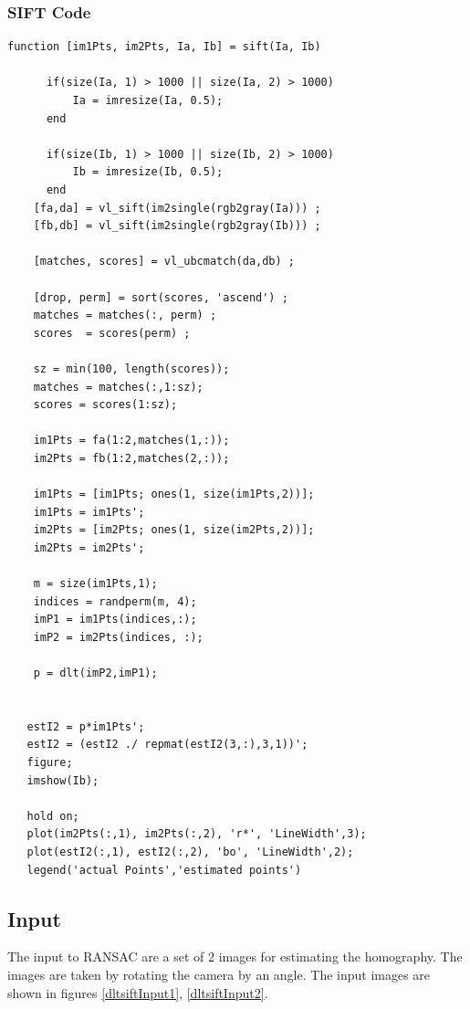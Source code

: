 \documentclass[12pt]{article}
\begin{document}
\subsubsection{SIFT Code}
\begin{lstlisting}
function [im1Pts, im2Pts, Ia, Ib] = sift(Ia, Ib)
    
      if(size(Ia, 1) > 1000 || size(Ia, 2) > 1000)
          Ia = imresize(Ia, 0.5);
      end
     
      if(size(Ib, 1) > 1000 || size(Ib, 2) > 1000)
          Ib = imresize(Ib, 0.5);
      end
    [fa,da] = vl_sift(im2single(rgb2gray(Ia))) ;
    [fb,db] = vl_sift(im2single(rgb2gray(Ib))) ;

    [matches, scores] = vl_ubcmatch(da,db) ;

    [drop, perm] = sort(scores, 'ascend') ;
    matches = matches(:, perm) ;
    scores  = scores(perm) ;

    sz = min(100, length(scores));
    matches = matches(:,1:sz);
    scores = scores(1:sz);

    im1Pts = fa(1:2,matches(1,:));
    im2Pts = fb(1:2,matches(2,:));
    
    im1Pts = [im1Pts; ones(1, size(im1Pts,2))];
    im1Pts = im1Pts';
    im2Pts = [im2Pts; ones(1, size(im2Pts,2))];
    im2Pts = im2Pts';
     
    m = size(im1Pts,1);
    indices = randperm(m, 4);
   	imP1 = im1Pts(indices,:);
   	imP2 = im2Pts(indices, :);

    p = dlt(imP2,imP1);

    
   estI2 = p*im1Pts';
   estI2 = (estI2 ./ repmat(estI2(3,:),3,1))';
   figure;
   imshow(Ib);

   hold on;
   plot(im2Pts(:,1), im2Pts(:,2), 'r*', 'LineWidth',3);
   plot(estI2(:,1), estI2(:,2), 'bo', 'LineWidth',2); 
   legend('actual Points','estimated points') 
    \end{lstlisting}
\subsection{Input}
The input to RANSAC are a set of 2 images for estimating the homography. The images are taken by rotating the camera by an angle. The input images are shown in figures \ref{dltsiftInput1}, \ref{dltsiftInput2}.
\end{document}
